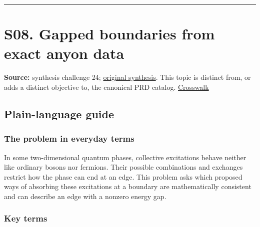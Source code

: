 \documentclass[
  11pt,
]{article}
\begin{document}
\begin{center}\rule{0.5\linewidth}{0.5pt}\end{center}

\section{S08. Gapped boundaries from exact anyon data}

\textbf{Source:} synthesis challenge 24;
\href{https://github.com/rick-stevens-ai/Pure-Thought/blob/main/NOTES/30-Most-Compelling-Pure-Thought-AI-Challenges.md}{original
synthesis}. This topic is distinct from, or adds a distinct objective
to, the canonical PRD catalog.
\href{https://github.com/rick-stevens-ai/Pure-Thought/blob/main/reviews/SYNTHESIS-CROSSWALK.md}{Crosswalk}

\subsection{Plain-language guide}

\subsubsection{The problem in everyday terms}

In some two-dimensional quantum phases, collective excitations behave
neither like ordinary bosons nor fermions. Their possible combinations
and exchanges restrict how the phase can end at an edge. This problem
asks which proposed ways of absorbing these excitations at a boundary
are mathematically consistent and can describe an edge with a nonzero
energy gap.

\subsubsection{Key terms}
\end{document}
